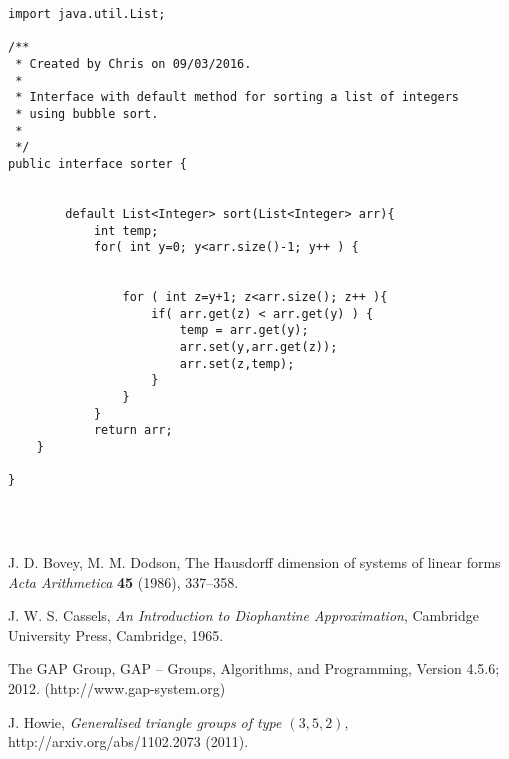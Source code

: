 \documentclass[11pt]{article}  %
\theoremstyle{definition}
\theoremstyle{remark}
\begin{document}
\begin{appendices}
\begin{lstlisting}
import java.util.List;

/**
 * Created by Chris on 09/03/2016.
 *
 * Interface with default method for sorting a list of integers
 * using bubble sort.
 *
 */
public interface sorter {


        default List<Integer> sort(List<Integer> arr){
            int temp;
            for( int y=0; y<arr.size()-1; y++ ) {


                for ( int z=y+1; z<arr.size(); z++ ){
                    if( arr.get(z) < arr.get(y) ) {
                        temp = arr.get(y);
                        arr.set(y,arr.get(z));
                        arr.set(z,temp);
                    }
                }
            }
            return arr;
    }

}




\end{lstlisting}
 
\end{appendices}



%
%
%
\begin{thebibliography}{99}

% 
%



%
J. D. Bovey, M. M. Dodson,                         %
The Hausdorff dimension of systems of linear forms %
{\em Acta Arithmetica}                             %
{\bf 45}                                           %
(1986), 337--358.                                   %

%
J. W. S. Cassels,                                  %
{\em An Introduction to Diophantine Approximation},%
Cambridge University Press, Cambridge, 1965.       %

%
The GAP Group, GAP -- Groups, Algorithms, and Programming,  %
Version 4.5.6; 2012. %
(http://www.gap-system.org)  %


%
J. Howie,                                            %
{\em Generalised triangle groups of type $(3,5,2)$}, %
http://arxiv.org/abs/1102.2073                       %
(2011).                                              %
\end{thebibliography}
\end{document}
